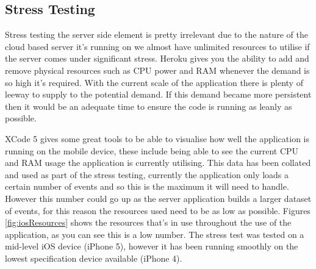 \subsection{Stress Testing}
	Stress testing the server side element is pretty irrelevant due to the nature of the cloud based server it's running on we almost have unlimited resources to utilise if the server comes under significant stress. Heroku gives you the ability to add and remove physical resources such as CPU power and RAM whenever the demand is so high it's required. With the current scale of the application there is plenty of leeway to supply to the potential demand. If this demand became more persistent then it would be an adequate time to ensure the code is running as leanly as possible. 

	XCode 5 gives some great tools to be able to visualise how well the application is running on the mobile device, these include being able to see the current CPU and RAM usage the application is currently utilising. This data has been collated and used as part of the stress testing, currently the application only loads a certain number of events and so this is the maximum it will need to handle. However this number could go up as the server application builds a larger dataset of events, for this reason the resources used need to be as low as possible. Figures \ref{fig:iosResources} shows the resources that's in use throughout the use of the application, as you can see this is a low number. The stress test was tested on a mid-level iOS device (iPhone 5), however it has been running smoothly on the lowest specification device available (iPhone 4).

